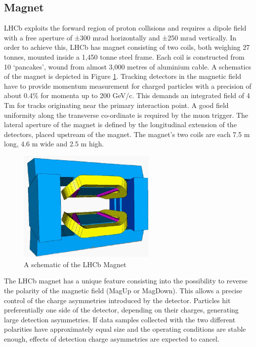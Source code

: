 \subsection{Magnet}
LHCb exploits the forward region of proton collisions and requires a dipole field with a free aperture of ±300 mrad horizontally and ±250 mrad vertically. In order to achieve this, LHCb has magnet\cite{LHCb:2000xej} consisting of two coils, both weighing 27 tonnes, mounted inside a 1,450 tonne steel frame. Each coil is constructed from 10 ‘pancakes’, wound from almost 3,000 metres of aluminium cable. A schematics of the magnet is depicted in Figure \ref{fig:magnet}.
Tracking detectors in the magnetic field have to provide momentum measurement for charged particles with a precision of about 0.4\% for momenta up to 200 GeV/c. This demands an integrated field of 4 Tm for tracks originating near the primary interaction point.
A good field uniformity along the transverse co-ordinate is required by the muon trigger. The lateral aperture of the magnet is defined by the longitudinal extension of the detectors, placed upstream of the magnet. The magnet’s two coils are each 7.5 m long, 4.6 m wide and 2.5 m high.
\begin{figure}
    \centering
    \includegraphics[width=0.6\textwidth]{figures/lhcb-magnet.png}
    \caption{A schematic of the LHCb Magnet}
    \label{fig:magnet}
\end{figure}
The LHCb magnet has a unique feature consisting into the possibility to reverse the polarity of the magnetic field (MagUp or MagDown). This allows a precise control of the charge asymmetries introduced by the detector. Particles hit preferentially one side of the detector, depending on their charges, generating large detection asymmetries. If data samples collected with the two different polarities have approximately equal size and the operating conditions are stable enough, effects of detection charge asymmetries are expected to cancel.

